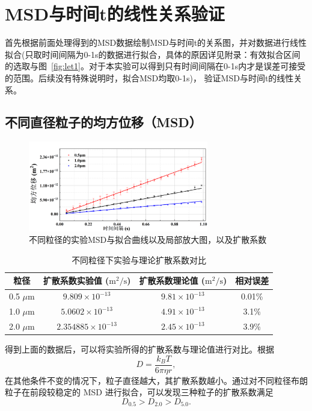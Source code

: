 \documentclass[a4paper]{report} %
\begin{document}
\section{MSD与时间t的线性关系验证}
首先根据前面处理得到的MSD数据绘制MSD与时间t的关系图，并对数据进行线性拟合(只取时间间隔为0-1s的数据进行拟合，具体的原因详见附录：有效拟合区间的选取与图~\ref{fig:let1}。对于本实验可以得到只有时间间隔在0-1s内才是误差可接受的范围。后续没有特殊说明时，拟合MSD均取0-1s)，
验证MSD与时间t的线性关系。 \par
\subsection{不同直径粒子的均方位移（MSD）}
\begin{figure}[H]
  \centering
  \includegraphics[width=0.7\textwidth]{实验数据拟合1.png}
  \caption{不同粒径的实验MSD与拟合曲线以及局部放大图，以及扩散系数}
  \label{fig:fit1}
\end{figure}
\begin{table}[H]
\centering
\begin{tabular}{cccc}
\hline
粒径 & 扩散系数实验值 ($\mathrm{m^2/s}$) & 扩散系数理论值 ($\mathrm{m^2/s}$) & 相对误差 \\
\hline
0.5 $\mu$m & $9.809 \times 10^{-13}$ & $9.81 \times 10^{-13}$ & 0.01\% \\
1.0 $\mu$m & $5.0602 \times 10^{-13}$ & $4.91 \times 10^{-13}$ & 3.1\% \\
2.0 $\mu$m & $2.354885 \times 10^{-13}$ & $2.45 \times 10^{-13}$ & 3.9\% \\
\hline
\end{tabular}
\caption{不同粒径下实验与理论扩散系数对比}
\end{table}

得到上面的数据后，可以将实验所得的扩散系数与理论值进行对比。根据
\begin{equation}
    D = \frac{k_B T}{6 \pi \eta r},
\end{equation}
在其他条件不变的情况下，粒子直径越大，其扩散系数越小。通过对不同粒径布朗粒子在前段较稳定的 MSD 进行拟合，可以发现三种粒子的扩散系数满足
\[
    D_{0.5} > D_{2.0} > D_{5.0}.
\]
\end{document}
